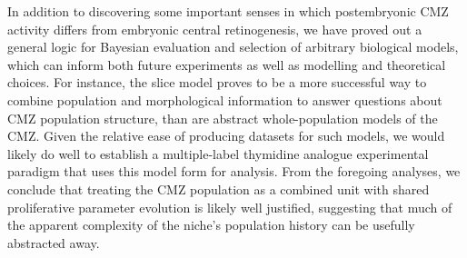 In addition to discovering some important senses in which postembryonic CMZ activity differs from embryonic central retinogenesis, we have proved out a general logic for Bayesian evaluation and selection of arbitrary biological models, which can inform both future experiments as well as modelling and theoretical choices. For instance, the slice model proves to be a more successful way to combine population and morphological information to answer questions about CMZ population structure, than are abstract whole-population models of the CMZ. Given the relative ease of producing datasets for such models, we would likely do well to establish a multiple-label thymidine analogue experimental paradigm that uses this model form for analysis. From the foregoing analyses, we conclude that treating the CMZ population as a combined unit with shared proliferative parameter evolution is likely well justified, suggesting that much of the apparent complexity of the niche's population history can be usefully abstracted away.

